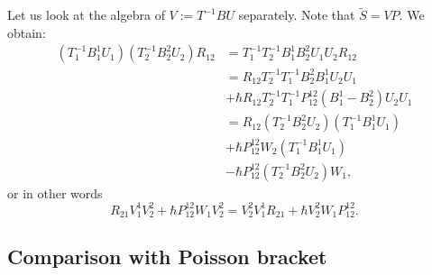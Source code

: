 \documentclass[11pt]{report}
\theoremstyle{definition}
\theoremstyle{remark}
\theoremstyle{remark}
\begin{document}
Let us look at the algebra of $V := T^{-1} B U$ separately. Note that $\tilde S = VP$. We obtain:
\begin{align*}
(T_1^{-1} B_1^1 U_1) (T_2^{-1} B_2^2 U_2) R_{12}
&= T_1^{-1} T_2^{-1} B_1^1 B_2^2 U_1 U_2 R_{12} \\
&= R_{12} T_2^{-1} T_1^{-1} B_2^2 B_1^1 U_2 U_1 \\
&+ \hbar R_{12} T_2^{-1} T_1^{-1} P_{12}^{12}(B_1^1-B_2^2) U_2 U_1 \\
&= R_{12} (T_2^{-1} B_2^2 U_2) (T_1^{-1} B_1^1 U_1) \\
&+ \hbar P_{12}^{12} W_2 (T_1^{-1} B_1^1 U_1) \\
&- \hbar P_{12}^{12} (T_2^{-1} B_2^2 U_2) W_1,
\end{align*}
or in other words
\begin{equation*}
R_{21} V_1^1 V_2^2 + \hbar P_{12}^{12} W_1 V_2^2 = V_2^2 V_1^1 R_{21} + \hbar V_2^2 W_1 P_{12}^{12}.
\end{equation*}

\subsection{Comparison with Poisson bracket}
\end{document}
